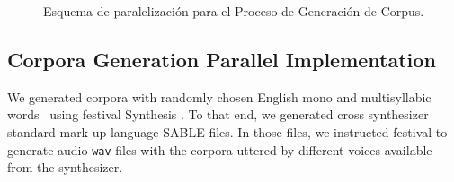 {\begin{figure}[tb] 
    \centering
    \hfill
	\caption{Esquema de paralelización para el Proceso de Generación de Corpus.}
  \label{fig:CorporaGenerationParallelization} 
\end{figure}
}{
\subsection{Corpora Generation Parallel Implementation}
\label{CorpGenImp}

We generated corpora with randomly chosen English mono and multisyllabic words~\cite{10.1371/journal.pone.0217966} using \gls{festival} Synthesis \cite{festival2014}. To that end, we generated cross synthesizer standard mark up language SABLE \cite{sable} files. In those files, we instructed \gls{festival} to generate audio \texttt{wav} files with the corpora uttered by different voices available from the synthesizer.

}
